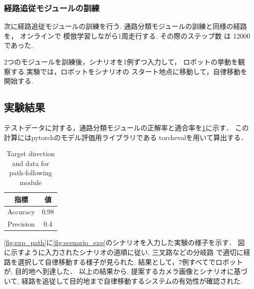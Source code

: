 \subsubsection{経路追従モジュールの訓練}
次に経路追従モジュールの訓練を行う.
通路分類モジュールの訓練と同様の経路を，
オンラインで 模倣学習しながら1周走行する.
その際のステップ数 は 12000 であった.

2つのモジュールを訓練後，シナリオを1例ずつ入力して，
ロボットの挙動を観察する.実験では，ロボットをシナリオの
スタート地点に移動して，自律移動を開始する.

\vspace{5zh}



\newpage
\subsection{実験結果}
テストデータに対する，通路分類モジュールの正解率と適合率を\ref{tab:result}に示す．
この計算にはpytorchのモデル評価用ライブラリである
torcheval\cite{torcheval}を用いて算出する．
\begin{table}[htbp]
    \centering
    \caption{Target direction and data for path-following module}
    \label{tab:result}
    \begin{tabular}{c|c}
    \hline
    指標 & 値        \\
    \hline
    Accuracy   & 0.98 \\
    Precision   & 0.4 \\
    \hline
    \end{tabular}
\end{table}

\ref{fig:exp_path}に\ref{fig:scenario_exp}のシナリオを入力した実験の様子を示す．
図に示すように入力されたシナリオの道順に従い, 三叉路などの分岐路
で適切に経路を選択して自律移動する様子が見られた.
結果として，7例すべてでロボットが, 目的地へ到達した．
以上の結果から, 提案するカメラ画像とシナリオに基づいて, 
経路を追従して目的地まで自律移動するシステムの有効性が確認された.

